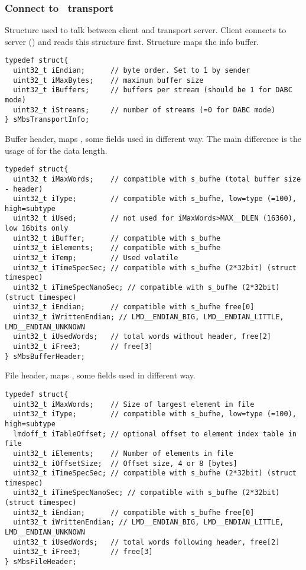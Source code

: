 \subsubsection[Connect to MBS transport]{Connect to \mbs\ transport}
Structure used to talk between client and transport server.
Client connects to server (\mbs) and reads this structure first.
Structure maps the  info buffer.
{\small \begin{verbatim}
typedef struct{
  uint32_t iEndian;      // byte order. Set to 1 by sender 
  uint32_t iMaxBytes;    // maximum buffer size                   
  uint32_t iBuffers;     // buffers per stream (should be 1 for DABC mode)
  uint32_t iStreams;     // number of streams (=0 for DABC mode)                   
} sMbsTransportInfo;
\end{verbatim}
}

Buffer header, maps , some fields used in different way.
The main difference is the usage of  for the data length.
{\small \begin{verbatim}
typedef struct{
  uint32_t iMaxWords;    // compatible with s_bufhe (total buffer size - header)
  uint32_t iType;        // compatible with s_bufhe, low=type (=100), high=subtype
  uint32_t iUsed;        // not used for iMaxWords>MAX__DLEN (16360), low 16bits only
  uint32_t iBuffer;      // compatible with s_bufhe
  uint32_t iElements;    // compatible with s_bufhe
  uint32_t iTemp;        // Used volatile
  uint32_t iTimeSpecSec; // compatible with s_bufhe (2*32bit) (struct timespec)
  uint32_t iTimeSpecNanoSec; // compatible with s_bufhe (2*32bit) (struct timespec)
  uint32_t iEndian;      // compatible with s_bufhe free[0]
  uint32_t iWrittenEndian; // LMD__ENDIAN_BIG, LMD__ENDIAN_LITTLE, LMD__ENDIAN_UNKNOWN
  uint32_t iUsedWords;   // total words without header, free[2]
  uint32_t iFree3;       // free[3]
} sMbsBufferHeader;
\end{verbatim}
}
File header, maps , some fields used in different way.
{\small \begin{verbatim}
typedef struct{
  uint32_t iMaxWords;    // Size of largest element in file
  uint32_t iType;        // compatible with s_bufhe, low=type (=100), high=subtype
  lmdoff_t iTableOffset; // optional offset to element index table in file
  uint32_t iElements;    // Number of elements in file
  uint32_t iOffsetSize;  // Offset size, 4 or 8 [bytes]
  uint32_t iTimeSpecSec; // compatible with s_bufhe (2*32bit) (struct timespec)
  uint32_t iTimeSpecNanoSec; // compatible with s_bufhe (2*32bit) (struct timespec)
  uint32_t iEndian;      // compatible with s_bufhe free[0]
  uint32_t iWrittenEndian; // LMD__ENDIAN_BIG, LMD__ENDIAN_LITTLE, LMD__ENDIAN_UNKNOWN
  uint32_t iUsedWords;   // total words following header, free[2]
  uint32_t iFree3;       // free[3]
} sMbsFileHeader;
\end{verbatim}
}
